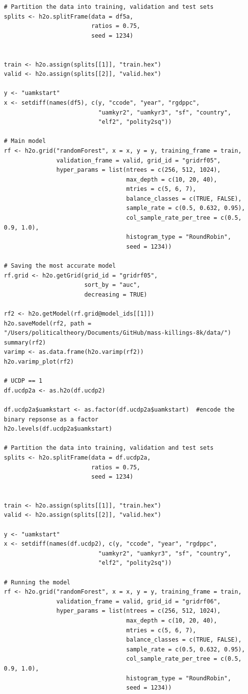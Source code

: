 \documentclass[a4paper,12pt]{article}
\begin{document}
\begin{verbatim}
# Partition the data into training, validation and test sets
splits <- h2o.splitFrame(data = df5a, 
                         ratios = 0.75, 
                         seed = 1234) 


train <- h2o.assign(splits[[1]], "train.hex")   
valid <- h2o.assign(splits[[2]], "valid.hex") 

y <- "uamkstart"
x <- setdiff(names(df5), c(y, "ccode", "year", "rgdppc",
                           "uamkyr2", "uamkyr3", "sf", "country",
                           "elf2", "polity2sq")) 

# Main model
rf <- h2o.grid("randomForest", x = x, y = y, training_frame = train, 
               validation_frame = valid, grid_id = "gridrf05",
               hyper_params = list(ntrees = c(256, 512, 1024),
                                   max_depth = c(10, 20, 40),
                                   mtries = c(5, 6, 7),
                                   balance_classes = c(TRUE, FALSE),
                                   sample_rate = c(0.5, 0.632, 0.95),
                                   col_sample_rate_per_tree = c(0.5, 0.9, 1.0),
                                   histogram_type = "RoundRobin",
                                   seed = 1234)) 

# Saving the most accurate model
rf.grid <- h2o.getGrid(grid_id = "gridrf05",
                       sort_by = "auc",
                       decreasing = TRUE)

rf2 <- h2o.getModel(rf.grid@model_ids[[1]])
h2o.saveModel(rf2, path = "/Users/politicaltheory/Documents/GitHub/mass-killings-8k/data/")
summary(rf2)
varimp <- as.data.frame(h2o.varimp(rf2))
h2o.varimp_plot(rf2)

# UCDP == 1
df.ucdp2a <- as.h2o(df.ucdp2)

df.ucdp2a$uamkstart <- as.factor(df.ucdp2a$uamkstart)  #encode the binary repsonse as a factor
h2o.levels(df.ucdp2a$uamkstart)

# Partition the data into training, validation and test sets
splits <- h2o.splitFrame(data = df.ucdp2a, 
                         ratios = 0.75, 
                         seed = 1234) 


train <- h2o.assign(splits[[1]], "train.hex")   
valid <- h2o.assign(splits[[2]], "valid.hex") 

y <- "uamkstart"
x <- setdiff(names(df.ucdp2), c(y, "ccode", "year", "rgdppc",
                           "uamkyr2", "uamkyr3", "sf", "country",
                           "elf2", "polity2sq")) 

# Running the model
rf <- h2o.grid("randomForest", x = x, y = y, training_frame = train, 
               validation_frame = valid, grid_id = "gridrf06",
               hyper_params = list(ntrees = c(256, 512, 1024),
                                   max_depth = c(10, 20, 40),
                                   mtries = c(5, 6, 7),
                                   balance_classes = c(TRUE, FALSE),
                                   sample_rate = c(0.5, 0.632, 0.95),
                                   col_sample_rate_per_tree = c(0.5, 0.9, 1.0),
                                   histogram_type = "RoundRobin",
                                   seed = 1234)) 


\end{verbatim}
\end{document}
